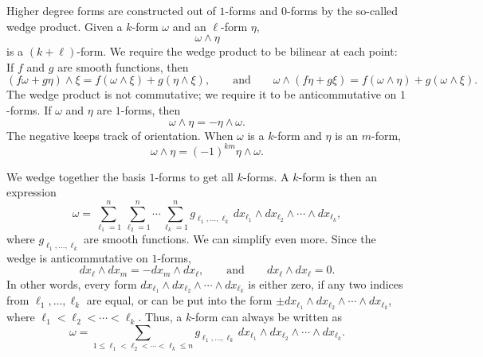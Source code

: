 \documentclass[12pt,openany]{book}
\theoremstyle{plain}
\theoremstyle{remark}
\theoremstyle{definition}
\theoremstyle{exercise}
\theoremstyle{example}
\begin{document}
Higher degree forms are constructed out of $1$-forms and $0$-forms
by the so-called wedge product.  Given a $k$-form $\omega$
and an $\ell$-form $\eta$,
%
\begin{equation*}
\omega \wedge \eta
\end{equation*}
is a $(k+\ell)$-form.  We require the wedge product to be bilinear at each point:
If $f$ and $g$ are smooth functions, then
\begin{equation*}
(f \omega + g \eta) \wedge \xi =
f (\omega \wedge \xi) + g (\eta \wedge \xi)
, \qquad
\text{and}
\qquad
\omega \wedge (f \eta + g \xi) =
f (\omega \wedge \eta ) +
g ( \omega \wedge \xi) .
\end{equation*}
The wedge product is not commutative; we require it to be
anticommutative on $1$-forms. If $\omega$ and $\eta$ are $1$-forms,
then
\begin{equation*}
\omega \wedge \eta = - \eta \wedge \omega .
\end{equation*}
The negative keeps track of orientation.
When $\omega$ is a $k$-form and $\eta$ is an $m$-form,
\begin{equation*}
\omega \wedge \eta = {(-1)}^{k m} \eta \wedge \omega .
\end{equation*}

We wedge together the basis $1$-forms to
get all $k$-forms.
A $k$-form is then an expression
\begin{equation*}
\omega =
\sum_{\ell_1=1}^n
\sum_{\ell_2=1}^n
\cdots
\sum_{\ell_k=1}^n
g_{\ell_1,\ldots,\ell_k}
\,
dx_{\ell_1} \wedge
dx_{\ell_2} \wedge
\cdots \wedge
dx_{\ell_k}  ,
\end{equation*}
where $g_{\ell_1,\ldots,\ell_k}$ are smooth functions.
We can simplify even more.  Since the wedge
is anticommutative on $1$-forms,
\begin{equation*}
dx_\ell \wedge dx_m =
-dx_m \wedge dx_\ell
,
\qquad
\text{and}
\qquad
dx_\ell \wedge dx_\ell = 0 .
\end{equation*}
In other words, every form
$dx_{\ell_1} \wedge
dx_{\ell_2} \wedge
\cdots \wedge
dx_{\ell_k}$
is either zero, if any two indices from $\ell_1,\ldots,\ell_k$ are equal, or
can be put into the form
$\pm dx_{\ell_1} \wedge
dx_{\ell_2} \wedge
\cdots \wedge
dx_{\ell_k}$, where $\ell_1 < \ell_2 < \cdots < \ell_k$.
Thus, a $k$-form can always be written as
\begin{equation*}
\omega =
\sum_{1 \leq \ell_1 < \ell_2 < \cdots < \ell_k \leq n}
g_{\ell_1,\ldots,\ell_k}
\,
dx_{\ell_1} \wedge
dx_{\ell_2} \wedge
\cdots \wedge
dx_{\ell_k}  .
\end{equation*}
\end{document}
